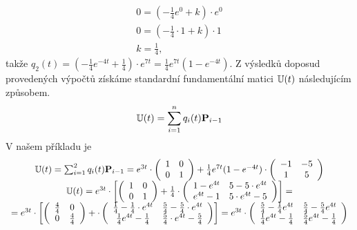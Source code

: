 \begin{equation*}
 \begin{array}{c}
 0 = \left( -\frac{1}{4}e^{0} + k\right) \cdot e^{0}\\
 0 = \left( -\frac{1}{4}\cdot 1 + k\right) \cdot 1\\
 k = \frac{1}{4},
 \end{array}
\end{equation*}
takže $q_2(t) = \left( -\frac{1}{4}e^{-4t} + \frac{1}{4}\right) \cdot e^{7t} = \frac{1}{4}e^{7t}(1-e^{-4t})$.\newline
Z výsledků doposud provedených výpočtů získáme standardní fundamentální matici ${{\mathbb{U}}}(t)$ následujícím způsobem.
\[
 {{\mathbb{U}}}(t) = \sum_{i=1}^{n}{q_i(t){\bf P}_{i-1}}
\]
V našem příkladu je
\begin{equation*}
 \begin{array}{c}
 {{\mathbb{U}}}(t) = \sum_{i=1}^{2}{q_i(t){\bf P}_{i - 1}} = e^{3t}\cdot\left(\begin{array}{cc} 1 & 0 \\ 0 & 1 \end{array}\right) + \frac{1}{4}e^{7t}(1 - e^{-4t}) \cdot \left(\begin{array}{cc} -1 & -5 \\ 1 & 5 \end{array}\right)\\ 
 {{\mathbb{U}}}(t) = e^{3t} \cdot\left[\left(\begin{array}{cc} 1 & 0 \\ 0 & 1 \end{array}\right) + \frac{1}{4} \cdot \left(\begin{array}{cc} 1 - e^{4t} & 5 - 5\cdot e^{4t} \\ e^{4t} - 1 & 5\cdot e^{4t} - 5 \end{array}\right)\right] = \\
 =e^{3t} \cdot\left[\left(\begin{array}{cc} \frac{4}{4} & 0 \\ 0 & \frac{4}{4} \end{array}\right) + \cdot \left(\begin{array}{cc} \frac{1}{4} - \frac{1}{4}\cdot e^{4t} & \frac{5}{4} - \frac{5}{4}\cdot e^{4t} \\ \frac{1}{4}e^{4t} - \frac{1}{4} & \frac{5}{4}\cdot e^{4t} - \frac{5}{4} \end{array}\right)\right] = e^{3t} \cdot\left( \begin{array}{cc} \frac{5}{4} - \frac{1}{4}e^{4t} & \frac{5}{4} - \frac{5}{4}e^{4t} \\ \frac{1}{4}e^{4t} - \frac{1}{4} & \frac{5}{4}e^{4t} - \frac{1}{4}  \end{array}\right)
 \end{array}
\end{equation*}
